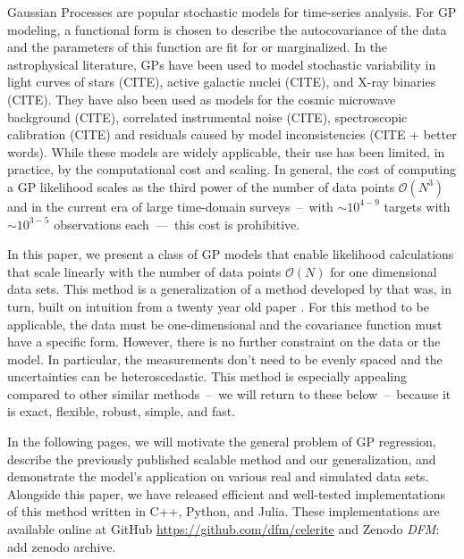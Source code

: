 \documentclass[manuscript, letterpaper]{aastex6}
\makeatletter
\let\origsection\section
\renewcommand\section{\@ifstar{\starsection}{\nostarsection}}
\newcommand\nostarsection[1]{\sectionprelude\origsection{#1}}
\newcommand\starsection[1]{\sectionprelude\origsection*{#1}}
\newcommand\sectionprelude{\vspace{1em}}
\newcommand{\project}[1]{\textsf{#1}}
\newcommand{\todo}[3]{{\color{#2}\emph{#1}: #3}}
\newcommand{\dfmtodo}[1]{\todo{DFM}{red}{#1}}
\makeatother
\begin{document}
\keywords{%
}

\section{Introduction}

Gaussian Processes \citep[GPs;][]{Rasmussen:2006} are popular stochastic
models for time-series analysis.
For GP modeling, a functional form is chosen to describe the autocovariance
of the data and the parameters of this function are fit for or marginalized.
In the astrophysical literature, GPs have been used to model stochastic
variability in light curves of stars (CITE), active galactic nuclei (CITE),
and X-ray binaries (CITE).
They have also been used as models for the cosmic microwave background (CITE),
correlated instrumental noise (CITE), spectroscopic calibration (CITE) and
residuals caused by model inconsistencies (CITE + better words).
While these models are widely applicable, their use has been limited, in
practice, by the computational cost and scaling.
In general, the cost of computing a GP likelihood scales as the third power of
the number of data points $\mathcal{O}(N^3)$ and in the current era of large
time-domain surveys~--~with $\sim10^{4-9}$ targets with $\sim10^{3-5}$
observations each~---~this cost is prohibitive.

In this paper, we present a class of GP models that enable likelihood
calculations that scale linearly with the number of data points
$\mathcal{O}(N)$ for one dimensional data sets.
This method is a generalization of a method developed by
\citet{Ambikasaran:2015} that was, in turn, built on intuition from a twenty
year old paper \citep{Rybicki:1995}.
For this method to be applicable, the data must be one-dimensional and the
covariance function must have a specific form.
However, there is no further constraint on the data or the model.
In particular, the measurements don't need to be evenly spaced and the
uncertainties can be heteroscedastic.
This method is especially appealing compared to other similar methods~--~we
will return to these below~--~because it is exact, flexible, robust, simple,
and fast.

In the following pages, we will motivate the general problem of GP regression,
describe the previously published scalable method \citep{Rybicki:1995,
Ambikasaran:2015} and our generalization, and demonstrate the model's
application on various real and simulated data sets.
Alongside this paper, we have released efficient and well-tested
implementations of this method written in \project{C++}, \project{Python}, and \project{Julia}.
These implementations are available online at \project{GitHub}
\url{https://github.com/dfm/celerite} and \project{Zenodo} \dfmtodo{add zenodo
archive}.
\end{document}
